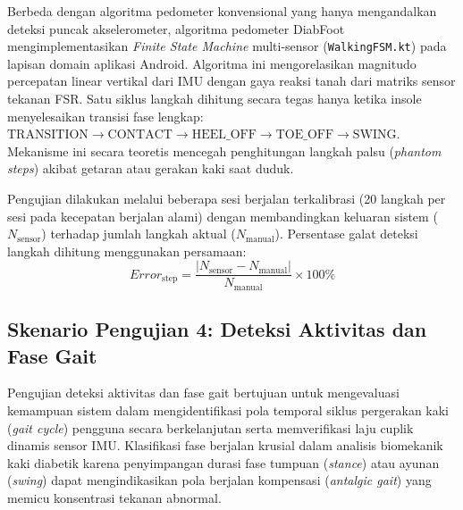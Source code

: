Berbeda dengan algoritma pedometer konvensional yang hanya mengandalkan deteksi puncak akselerometer, algoritma pedometer DiabFoot mengimplementasikan \textit{Finite State Machine} multi-sensor (\texttt{WalkingFSM.kt}) pada lapisan domain aplikasi Android. Algoritma ini mengorelasikan magnitudo percepatan linear vertikal dari IMU dengan gaya reaksi tanah dari matriks sensor tekanan FSR. Satu siklus langkah dihitung secara tegas hanya ketika insole menyelesaikan transisi fase lengkap: $\mathrm{TRANSITION} \rightarrow \mathrm{CONTACT} \rightarrow \mathrm{HEEL\_OFF} \rightarrow \mathrm{TOE\_OFF} \rightarrow \mathrm{SWING}$. Mekanisme ini secara teoretis mencegah penghitungan langkah palsu (\textit{phantom steps}) akibat getaran atau gerakan kaki saat duduk.

Pengujian dilakukan melalui beberapa sesi berjalan terkalibrasi (20 langkah per sesi pada kecepatan berjalan alami) dengan membandingkan keluaran sistem ($N_{\mathrm{sensor}}$) terhadap jumlah langkah aktual ($N_{\mathrm{manual}}$). Persentase galat deteksi langkah dihitung menggunakan persamaan:
\begin{equation}
Error_{\mathrm{step}} = \frac{\left|N_{\mathrm{sensor}}-N_{\mathrm{manual}}\right|}{N_{\mathrm{manual}}} \times 100\%
\end{equation}

\subsection{Skenario Pengujian 4: Deteksi Aktivitas dan Fase Gait}
\label{subsec:Skenario4}

Pengujian deteksi aktivitas dan fase gait bertujuan untuk mengevaluasi kemampuan sistem dalam mengidentifikasi pola temporal siklus pergerakan kaki (\textit{gait cycle}) pengguna secara berkelanjutan serta memverifikasi laju cuplik dinamis sensor IMU. Klasifikasi fase berjalan krusial dalam analisis biomekanik kaki diabetik karena penyimpangan durasi fase tumpuan (\textit{stance}) atau ayunan (\textit{swing}) dapat mengindikasikan pola berjalan kompensasi (\textit{antalgic gait}) yang memicu konsentrasi tekanan abnormal.

